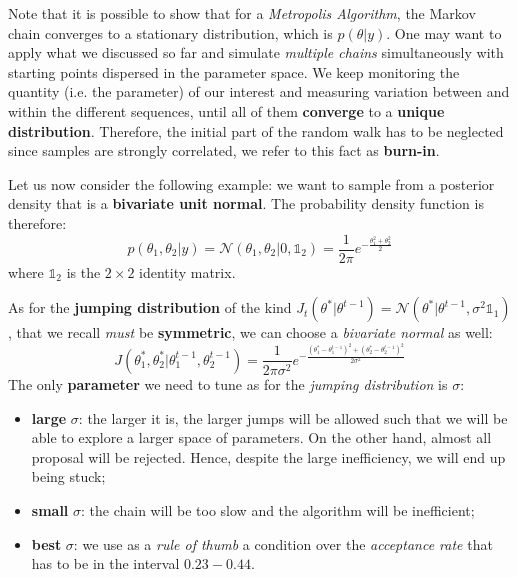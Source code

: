 \documentclass[../main/main.tex]{subfiles}
\begin{document}
Note that it is possible to show that for a \textit{Metropolis Algorithm}, the Markov chain converges to a stationary distribution, which is $p(\theta|y)$. One may want to apply what we discussed so far and simulate \textit{multiple chains} simultaneously with starting points dispersed in the parameter space.
We keep monitoring the quantity (i.e. the parameter) of our interest and measuring variation between and within the different sequences, until all of them \textbf{converge} to a \textbf{unique distribution}. Therefore, the initial part of the random walk has to be neglected since samples are strongly correlated, we refer to this fact as \textbf{burn-in}.

Let us now consider the following example: we want to sample from a posterior density that is a \textbf{bivariate unit normal}. The probability density function is therefore:
\begin{equation*}
    p(\theta_1, \theta_2 |y) = \mathcal{N}(\theta_1, \theta_2|0,\mathbb{1}_2) = \frac{1}{2\pi} e^{- \frac{\theta_1^2+\theta_2^2}{2}}
\end{equation*}
where $\mathbb{1}_2$ is the $2\times 2$ identity matrix.

As for the \textbf{jumping distribution} of the kind $J_t(\theta^*|\theta^{t-1}) = \mathcal{N}(\theta^*|\theta^{t-1}, \sigma^2\mathbb{1}_1 )$, that we recall \textit{must} be \textbf{symmetric}, we can choose a \textit{bivariate normal} as well:
\begin{equation*}
    J(\theta^*_1,\theta^*_2| \theta^{t-1}_1,\theta^{t-1}_2) = \frac{1}{2\pi \sigma^2}e^{-\frac{(\theta_1^* - \theta_1^{t-1} )^2+(\theta_2^* - \theta_2^{t-1})^2}{2 \sigma^2}}
\end{equation*}
The only \textbf{parameter} we need to tune as for the \textit{jumping distribution} is $\sigma$:
\begin{itemize}
    \item \textbf{large} $\sigma$: the larger it is, the larger jumps will be allowed such that we will be able to explore a larger space of parameters. On the other hand, almost all proposal will be rejected. Hence, despite the large inefficiency, we will end up being stuck;
    \item \textbf{small} $\sigma$: the chain will be too slow and the algorithm will be inefficient;
    \item \textbf{best} $\sigma$: we use as a \textit{rule of thumb} a condition over the \textit{acceptance rate} that has to be in the interval $0.23-0.44$.
\end{itemize}
\end{document}
